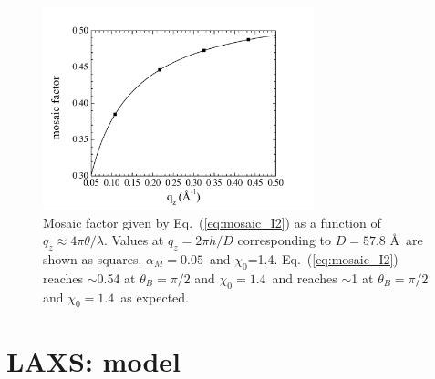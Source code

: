 \begin{figure}
  \centering
  \includegraphics[width=0.7\textwidth]{figures/ripple/analysis/mosaic_correction}
  \caption[Mosaic factor given by Eq.~(\ref{eq:mosaic_I2}) as a function of 
  $q_z\approx 4\pi\theta/\lambda$]{Mosaic factor given by 
  Eq.~(\ref{eq:mosaic_I2}) as a function of 
  $q_z\approx 4\pi\theta/\lambda$. Values at $q_z=2\pi h/D$ corresponding 
  to $D=57.8$ \AA\ are shown as squares. $\alpha_M=0.05$\textdegree\ and 
  $\chi_0$=1.4\textdegree. Eq.~(\ref{eq:mosaic_I2}) reaches $\sim$0.54 at 
  $\theta_B=\pi/2$ and $\chi_0=1.4$\textdegree\ and reaches $\sim$1 at
  $\theta_B=\pi/2$ and $\chi_0=1.4$\textdegree\ as expected.}
  \label{fig:mosaic_correction}
\end{figure}

%

\newpage
\section{LAXS: model}
